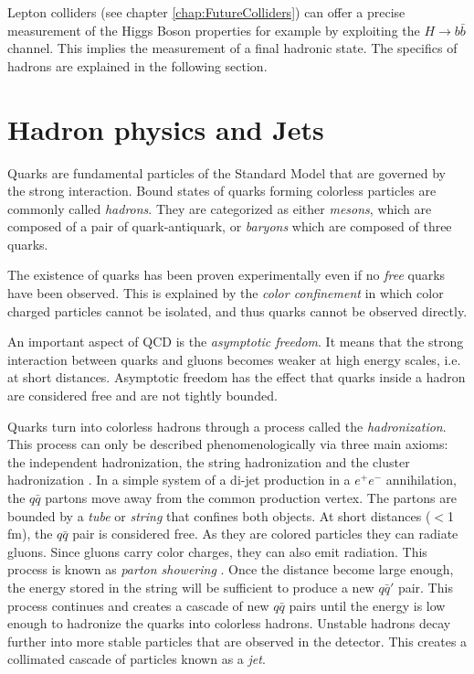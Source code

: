 Lepton colliders (see chapter \ref{chap:FutureColliders}) can offer a precise measurement of the Higgs Boson properties for example by exploiting the $H \rightarrow b\bar{b}$ channel. This implies the measurement of a final hadronic state. The specifics of hadrons are explained in the following section.

\section{Hadron physics and Jets}
\label{sec:Hadrons}

Quarks are fundamental particles of the Standard Model that are governed by the strong interaction. Bound states of quarks forming colorless particles are commonly called \textit{hadrons}. They are categorized as either \textit{mesons}, which are composed of a pair of quark-antiquark, or \textit{baryons} which are composed of three quarks.

The existence of quarks has been proven experimentally even if no \textit{free} quarks have been observed. This is explained by the \textit{color confinement} in which color charged particles cannot be isolated, and thus quarks cannot be observed directly.

An important aspect of QCD is the \textit{asymptotic freedom}. It means that the strong interaction between quarks and gluons becomes weaker at high energy scales, i.e. at short distances. Asymptotic freedom has the effect that quarks inside a hadron are considered free and are not tightly bounded.

Quarks turn into colorless hadrons through a process called the \textit{hadronization}. This process can only be described phenomenologically via three main axioms: the independent hadronization, the string hadronization \cite{Artru1988} and the cluster hadronization \cite{Webber:1983if}. In a simple system of a di-jet production in a $e^+e^-$ annihilation, the $q\bar{q}$ partons move away from the common production vertex. The partons are bounded by a \textit{tube} or \textit{string} that confines both objects. At short distances ($<$1 fm), the $q\bar{q}$ pair is considered free. As they are colored particles they can radiate gluons. Since gluons carry color charges, they can also emit radiation. This process is known as \textit{parton showering} \cite{Feynman:1969wa}. Once the distance become large enough, the energy stored in the string will be sufficient to produce a new $q\bar{q}'$ pair. This process continues and creates a cascade of new $q\bar{q}$ pairs until the energy is low enough to hadronize the quarks into colorless hadrons. Unstable hadrons decay further into more stable particles that are observed in the detector. This creates a collimated cascade of particles known as a \textit{jet}.

